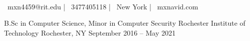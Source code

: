 \documentclass[]{awesome-cv}
\begin{document}
    
\begin{center}
	  \\
	\vspace{2mm}
	{\faEnvelope\ mxn4459@rit.edu} | {\faMobile\ 3477405118} | {\faMapMarker\ New York} | {\faLink\ mxnavid.com}
\end{center}
\begin{cventries}
	\cventry
	{B.Sc in Computer Science, Minor in Computer Security}
	{Rochester Institute of Technology}
	{Rochester, NY}
	{September 2016 – May 2021}
	{}
\end{cventries}
\end{document}
